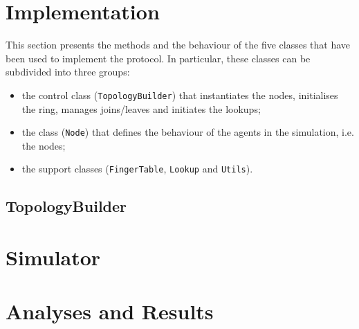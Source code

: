 \documentclass[11pt,twocolumn,letterpaper]{article}
\begin{document}
	\section{Implementation}
	\label{sec:implementation}
	This section presents the methods and the behaviour of the five classes that have been used to implement the protocol. In particular, these classes can be subdivided into three groups:
	\begin{itemize}
		\item the control class (\texttt{TopologyBuilder}) that instantiates the nodes, initialises the ring, manages joins/leaves and initiates the lookups;
		\item the class (\texttt{Node}) that defines the behaviour of the agents in the simulation, i.e. the nodes;
		\item the support classes (\texttt{FingerTable}, \texttt{Lookup} and \texttt{Utils}).
	\end{itemize}

	\subsection{TopologyBuilder}
	\label{subsec:topbuilder}
	
	\section{Simulator}
	\label{sec:simulator}
	
	\section{Analyses and Results}
	\label{sec:analyses}
	
	\printbibliography
\end{document}

